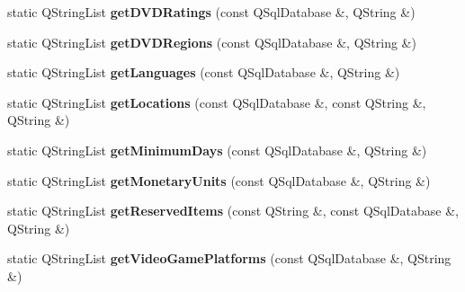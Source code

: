 \begin{DoxyCompactItemize}
\item 
static Q\+String\+List {\bfseries get\+D\+V\+D\+Ratings} (const Q\+Sql\+Database \&, Q\+String \&)\hypertarget{classbiblioteq__misc__functions_a04d50452a48e1b8fd520f0136f7b60ab}{}\label{classbiblioteq__misc__functions_a04d50452a48e1b8fd520f0136f7b60ab}

\item 
static Q\+String\+List {\bfseries get\+D\+V\+D\+Regions} (const Q\+Sql\+Database \&, Q\+String \&)\hypertarget{classbiblioteq__misc__functions_a3f5689ef80dd5f614050dd0f2aed681e}{}\label{classbiblioteq__misc__functions_a3f5689ef80dd5f614050dd0f2aed681e}

\item 
static Q\+String\+List {\bfseries get\+Languages} (const Q\+Sql\+Database \&, Q\+String \&)\hypertarget{classbiblioteq__misc__functions_aed83ef40a90320f4152eff2c2f7e9b2c}{}\label{classbiblioteq__misc__functions_aed83ef40a90320f4152eff2c2f7e9b2c}

\item 
static Q\+String\+List {\bfseries get\+Locations} (const Q\+Sql\+Database \&, const Q\+String \&, Q\+String \&)\hypertarget{classbiblioteq__misc__functions_a7c8d2ee3be52249f8124f1590f333a97}{}\label{classbiblioteq__misc__functions_a7c8d2ee3be52249f8124f1590f333a97}

\item 
static Q\+String\+List {\bfseries get\+Minimum\+Days} (const Q\+Sql\+Database \&, Q\+String \&)\hypertarget{classbiblioteq__misc__functions_ac3a2ae6c7904c5f737719b1e124f5513}{}\label{classbiblioteq__misc__functions_ac3a2ae6c7904c5f737719b1e124f5513}

\item 
static Q\+String\+List {\bfseries get\+Monetary\+Units} (const Q\+Sql\+Database \&, Q\+String \&)\hypertarget{classbiblioteq__misc__functions_a49bcf8c630bf6f35ad28912cdb4ab3c1}{}\label{classbiblioteq__misc__functions_a49bcf8c630bf6f35ad28912cdb4ab3c1}

\item 
static Q\+String\+List {\bfseries get\+Reserved\+Items} (const Q\+String \&, const Q\+Sql\+Database \&, Q\+String \&)\hypertarget{classbiblioteq__misc__functions_a754e81d3b40731aa247099c81b450871}{}\label{classbiblioteq__misc__functions_a754e81d3b40731aa247099c81b450871}

\item 
static Q\+String\+List {\bfseries get\+Video\+Game\+Platforms} (const Q\+Sql\+Database \&, Q\+String \&)\hypertarget{classbiblioteq__misc__functions_a20dd8ecdb625c4cc11b58518873240e9}{}\label{classbiblioteq__misc__functions_a20dd8ecdb625c4cc11b58518873240e9}


\end{DoxyCompactItemize}
